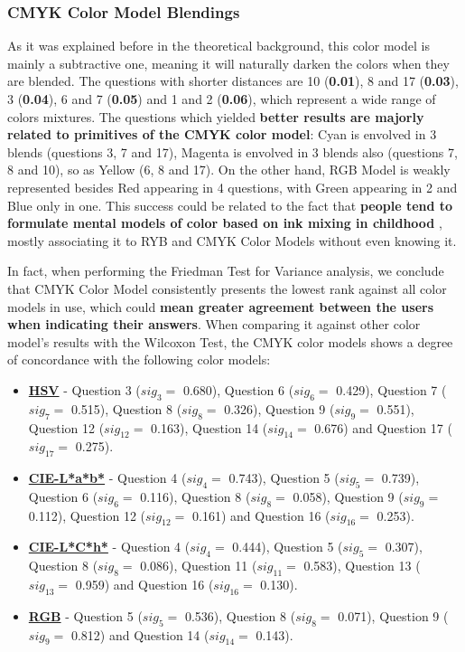 \subsubsection{CMYK Color Model Blendings}
\label{subsubsec:cmykcolormodel}
%
As it was explained before in the theoretical background, this color model is mainly a subtractive one, meaning it will naturally darken the colors when they are blended. The questions with shorter distances are 10 (\textbf{0.01}), 8 and 17 (\textbf{0.03}), 3 (\textbf{0.04}), 6 and 7 (\textbf{0.05})
and 1 and 2 (\textbf{0.06}), which represent a wide range of colors mixtures. The questions which yielded \textbf{better results are majorly related to primitives of the CMYK color model}: Cyan is envolved in 3 blends (questions 3, 7 and 17), Magenta is envolved in 3 blends also (questions 7, 8 and
10), so as Yellow (6, 8 and 17). On the other hand, RGB Model is weakly represented besides Red appearing in 4 questions, with Green appearing in 2 and Blue only in one. This success could be related to the fact that \textbf{people tend to formulate mental models of color based on ink mixing in childhood}
\cite{Gossett2004}, mostly associating it to \gls{RYB} and CMYK Color Models without even knowing it. \par
%
In fact, when performing the Friedman Test for Variance analysis, we conclude that CMYK Color Model consistently presents the lowest rank against all color models in use, which could \textbf{mean greater agreement between the users when indicating their answers}. When comparing it against other color model's
results with the Wilcoxon Test, the CMYK color models shows a degree of concordance with the following color models:
%
\begin{itemize}
  \item \textbf{\ul{HSV}} - Question 3 ($sig_{3} = $ 0.680), Question 6 ($sig_{6} = $ 0.429), Question 7 ($sig_{7} = $ 0.515), Question 8 ($sig_{8} = $ 0.326), Question 9 ($sig_{9} = $ 0.551), Question 12 ($sig_{12} = $ 0.163), Question 14 ($sig_{14} = $ 0.676) and Question 17 ($sig_{17} = $ 0.275).
  \item \textbf{\ul{CIE-L*a*b*}} - Question 4 ($sig_{4} = $ 0.743), Question 5 ($sig_{5} = $ 0.739), Question 6 ($sig_{6} = $ 0.116), Question 8 ($sig_{8} = $ 0.058), Question 9 ($sig_{9} = $ 0.112), Question 12 ($sig_{12} = $ 0.161) and Question 16 ($sig_{16} = $ 0.253).
  \item \textbf{\ul{CIE-L*C*h*}} - Question 4 ($sig_{4} = $ 0.444), Question 5 ($sig_{5} = $ 0.307), Question 8 ($sig_{8} = $ 0.086), Question 11 ($sig_{11} = $ 0.583), Question 13 ($sig_{13} = $ 0.959) and Question 16 ($sig_{16} = $ 0.130).
  \item \textbf{\ul{RGB}} - Question 5 ($sig_{5} = $ 0.536), Question 8 ($sig_{8} = $ 0.071), Question 9 ($sig_{9} = $ 0.812) and Question 14 ($sig_{14} = $ 0.143).
\end{itemize}
